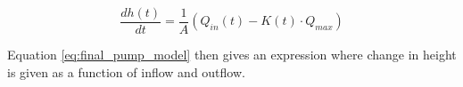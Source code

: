 \begin{equation}\label{eq:final_pump_model}
  	\frac{dh(t)}{dt}=\frac{1}{A} \left(Q_{in}(t)-K(t) \cdot Q_{max}\right)
\end{equation}

Equation \ref{eq:final_pump_model} then gives an expression where change in height is given as a function of inflow and outflow. 






